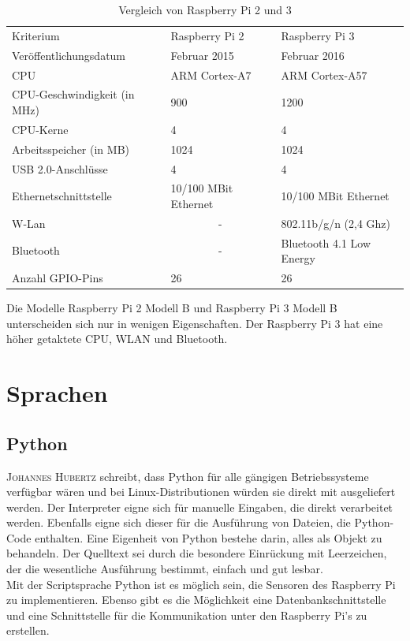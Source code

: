 \begin{table}[htb]
\centering
\caption{Vergleich von Raspberry Pi 2 und 3 \cite{CortexA7} \cite{CortexA57}}
\label{tab:VergleichRaspberry}
\begin{tabular}{lll}
Kriterium                    & Raspberry Pi 2        					& Raspberry Pi 3           \\
Veröffentlichungsdatum       & Februar 2015          					& Februar 2016             \\
CPU                          & ARM Cortex-A7   & ARM Cortex-A57           \\
CPU-Geschwindigkeit (in MHz) & 900             & 1200                     \\
CPU-Kerne                    & 4                              & 4                        \\
Arbeitsspeicher (in MB)      & 1024                  					& 1024                     \\
USB 2.0-Anschlüsse           & 4                     					& 4                        \\
Ethernetschnittstelle        & 10/100 MBit Ethernet  					& 10/100 MBit Ethernet     \\
W-Lan                        & \multicolumn{1}{c}{-} 					& 802.11b/g/n (2,4 Ghz)    \\
Bluetooth                    & \multicolumn{1}{c}{-} 					& Bluetooth 4.1 Low Energy \\
Anzahl GPIO-Pins             & 26                    					& 26                      
\end{tabular}
\end{table}
 
Die Modelle Raspberry Pi 2 Modell B und Raspberry Pi 3 Modell B unterscheiden sich nur in wenigen Eigenschaften. Der Raspberry Pi 3 hat eine höher getaktete CPU, WLAN und Bluetooth.

\section{Sprachen}

\subsection{Python}\label{Python}
\textsc{Johannes Hubertz}\cite{hubertz2016softwaretests} schreibt, dass Python für alle gängigen Betriebssysteme verfügbar wären und bei Linux-Distributionen würden sie direkt mit ausgeliefert werden. Der Interpreter eigne sich für manuelle Eingaben, die direkt verarbeitet werden. Ebenfalls eigne sich dieser für die Ausführung von Dateien, die Python-Code enthalten. Eine Eigenheit von Python bestehe darin, alles als Objekt zu behandeln. Der Quelltext sei durch die besondere Einrückung mit Leerzeichen, der die wesentliche Ausführung bestimmt, einfach und gut lesbar. \\
Mit der Scriptsprache Python ist es möglich sein, die Sensoren des Raspberry Pi zu implementieren. Ebenso gibt es die Möglichkeit eine Datenbankschnittstelle und eine Schnittstelle für die Kommunikation unter den Raspberry Pi's zu erstellen.

